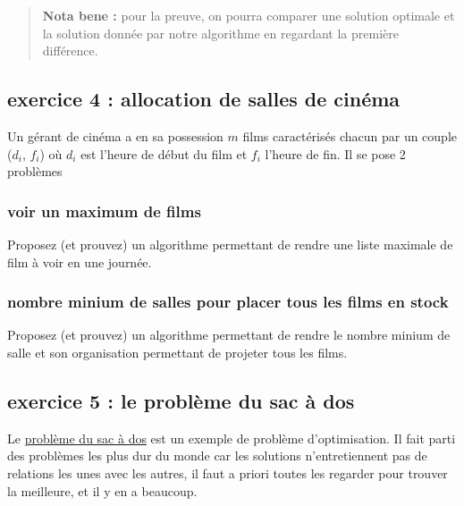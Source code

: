 \documentclass[
]{article}
\begin{document}
\begin{quote}
\textbf{Nota bene :} pour la preuve, on pourra comparer une solution
optimale et la solution donnée par notre algorithme en regardant la
première différence.
\end{quote}

\hypertarget{exercice-4-allocation-de-salles-de-cinuxe9ma}{%
\subsection{exercice 4 : allocation de salles de
cinéma}\label{exercice-4-allocation-de-salles-de-cinuxe9ma}}

Un gérant de cinéma a en sa possession $m$ films caractérisés chacun
par un couple ($d_i$, $f_i$) où $d_i$ est l'heure de début du film
et $f_i$ l'heure de fin. Il se pose 2 problèmes

\hypertarget{voir-un-maximum-de-films}{%
\subsubsection{voir un maximum de
films}\label{voir-un-maximum-de-films}}

Proposez (et prouvez) un algorithme permettant de rendre une liste
maximale de film à voir en une journée.

\hypertarget{nombre-minium-de-salles-pour-placer-tous-les-films-en-stock}{%
\subsubsection{nombre minium de salles pour placer tous les films en
stock}\label{nombre-minium-de-salles-pour-placer-tous-les-films-en-stock}}

Proposez (et prouvez) un algorithme permettant de rendre le nombre
minium de salle et son organisation permettant de projeter tous les
films.

\hypertarget{exercice-5-le-probluxe8me-du-sac-uxe0-dos}{%
\subsection{exercice 5 : le problème du sac à
dos}\label{exercice-5-le-probluxe8me-du-sac-uxe0-dos}}

Le
\href{https://fr.wikipedia.org/wiki/Probl\%C3\%A8me_du_sac_\%C3\%A0_dos}{problème
du sac à dos} est un exemple de problème d'optimisation. Il fait parti
des problèmes les plus dur du monde car les solutions n'entretiennent
pas de relations les unes avec les autres, il faut a priori toutes les
regarder pour trouver la meilleure, et il y en a beaucoup.
\end{document}

